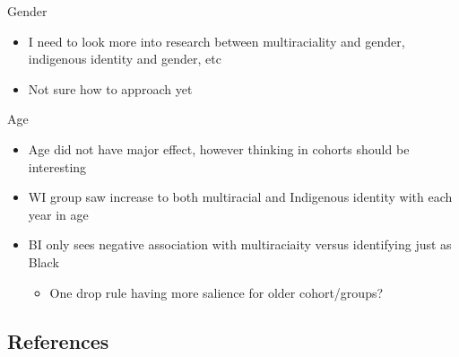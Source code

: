 \documentclass[
  12pt,
  letterpaper,
]{article}
\providecommand{\tightlist}{%
  \setlength{\itemsep}{0pt}\setlength{\parskip}{0pt}}\usepackage{longtable,booktabs,array}
\begin{document}
Gender

\begin{itemize}
\item
  I need to look more into research between multiraciality and gender,
  indigenous identity and gender, etc
\item
  Not sure how to approach yet
\end{itemize}

Age

\begin{itemize}
\item
  Age did not have major effect, however thinking in cohorts should be
  interesting
\item
  WI group saw increase to both multiracial and Indigenous identity with
  each year in age
\item
  BI only sees negative association with multiraciaity versus
  identifying just as Black

  \begin{itemize}
  \tightlist
  \item
    One drop rule having more salience for older cohort/groups?
  \end{itemize}
\end{itemize}

\subsection{References}\label{references}
\end{document}
